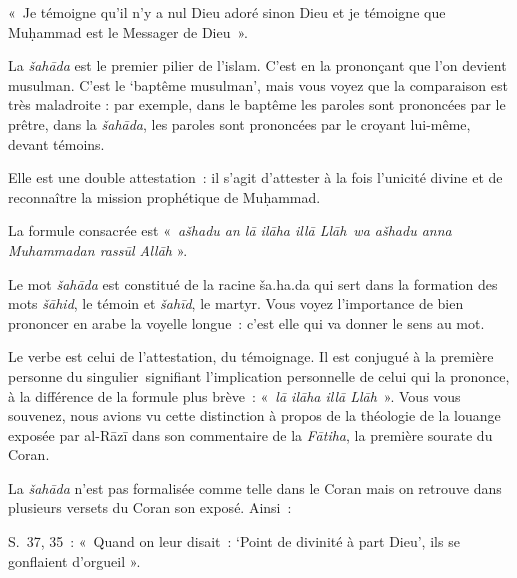«~Je témoigne qu'il n'y a nul Dieu adoré sinon Dieu et je témoigne que
Muḥammad est le Messager de Dieu~».





La \emph{šahāda} est le premier pilier de l'islam. C'est en la
prononçant que l'on devient musulman. C'est le `baptême musulman', mais
vous voyez que la comparaison est très maladroite : par exemple, dans le
baptême les paroles sont prononcées par le prêtre, dans la
\emph{šahāda}, les paroles sont prononcées par le croyant lui-même,
devant témoins.

Elle est une double attestation~: il s'agit d'attester à la fois
l'unicité divine et de reconnaître la mission prophétique de Muḥammad.

La formule consacrée est «~\emph{ašhadu an lā ilāha illā Llāh}~\emph{wa
ašhadu anna Muhammadan rassūl Allāh} ».

Le mot \emph{šahāda} est constitué de la racine ša.ha.da qui sert dans
la formation des mots \emph{šāhid}, le témoin et \emph{šahīd}, le
martyr. Vous voyez l'importance de bien prononcer en arabe la voyelle
longue~: c'est elle qui va donner le sens au mot.

Le verbe est celui de l'attestation, du témoignage. Il est conjugué à la
première personne du singulier~signifiant l'implication personnelle de
celui qui la prononce, à la différence de la formule plus brève~:
«~\emph{lā ilāha illā Llāh}~». Vous vous souvenez, nous avions vu cette
distinction à propos de la théologie de la louange exposée par al-Rāzī
dans son commentaire de la \emph{Fātiha}, la première sourate du Coran.


La \emph{šahāda} n'est pas formalisée comme telle dans le Coran mais on
retrouve dans plusieurs versets du Coran son exposé. Ainsi~:

S.~37, 35~: «~Quand on leur disait~: `Point de divinité à part Dieu',
ils se gonflaient d'orgueil ».

